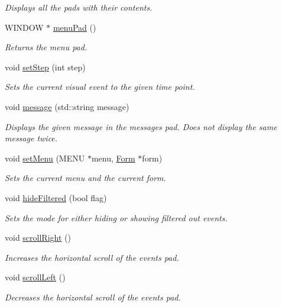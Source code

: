 \begin{DoxyCompactItemize}
\begin{DoxyCompactList}\small\item\em Displays all the pads with their contents. \end{DoxyCompactList}\item 
W\+I\+N\+D\+OW $\ast$ \hyperlink{structLogWindow_a7a1a00972f3c2718629fef3310623d67}{menu\+Pad} ()
\begin{DoxyCompactList}\small\item\em Returns the menu pad. \end{DoxyCompactList}\item 
void \hyperlink{structLogWindow_a5985bdd232e30596ae70663ae6b7c128}{set\+Step} (int step)
\begin{DoxyCompactList}\small\item\em Sets the current visual event to the given time point. \end{DoxyCompactList}\item 
void \hyperlink{structLogWindow_abadd88fdd20b17b7e009e76897f43d20}{message} (std\+::string message)
\begin{DoxyCompactList}\small\item\em Displays the given message in the messages pad. Does not display the same message twice. \end{DoxyCompactList}\item 
void \hyperlink{structLogWindow_a76a26172bf158136e588a602f37b8695}{set\+Menu} (M\+E\+NU $\ast$menu, \hyperlink{structForm}{Form} $\ast$form)
\begin{DoxyCompactList}\small\item\em Sets the current menu and the current form. \end{DoxyCompactList}\item 
void \hyperlink{structLogWindow_aadba0deab7161e4be752ed62d53056db}{hide\+Filtered} (bool flag)
\begin{DoxyCompactList}\small\item\em Sets the mode for either hiding or showing filtered out events. \end{DoxyCompactList}\item 
void \hyperlink{structLogWindow_ae985bcbe8b27d17de36c515b2f639d68}{scroll\+Right} ()\hypertarget{structLogWindow_ae985bcbe8b27d17de36c515b2f639d68}{}\label{structLogWindow_ae985bcbe8b27d17de36c515b2f639d68}

\begin{DoxyCompactList}\small\item\em Increases the horizontal scroll of the events pad. \end{DoxyCompactList}\item 
void \hyperlink{structLogWindow_a86e5bc6bae04f3615e323cf21d506083}{scroll\+Left} ()\hypertarget{structLogWindow_a86e5bc6bae04f3615e323cf21d506083}{}\label{structLogWindow_a86e5bc6bae04f3615e323cf21d506083}

\begin{DoxyCompactList}\small\item\em Decreases the horizontal scroll of the events pad. \end{DoxyCompactList}\end{DoxyCompactItemize}
